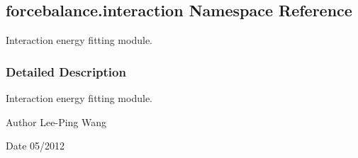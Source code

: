 \hypertarget{namespaceforcebalance_1_1interaction}{}\subsection{forcebalance.\+interaction Namespace Reference}
\label{namespaceforcebalance_1_1interaction}


Interaction energy fitting module.  




\subsubsection{Detailed Description}
Interaction energy fitting module. 

\begin{DoxyAuthor}{Author}
Lee-\/\+Ping Wang 
\end{DoxyAuthor}
\begin{DoxyDate}{Date}
05/2012 
\end{DoxyDate}
